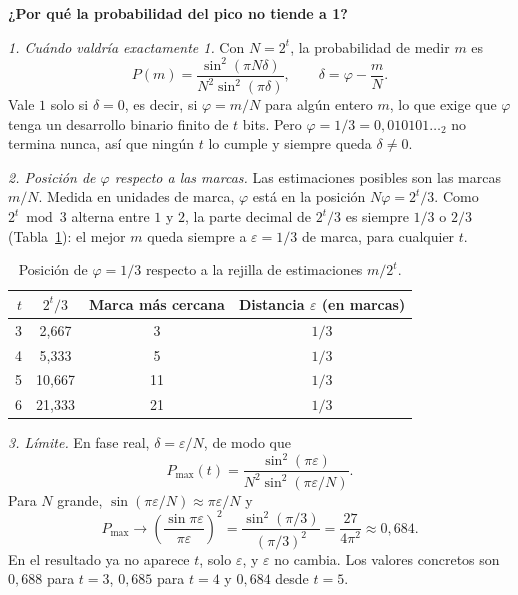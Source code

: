 \noindent\textbf{¿Por qué la probabilidad del pico no tiende a 1?}

\medskip
\noindent\textit{1. Cuándo valdría exactamente 1.} Con $N = 2^t$, la probabilidad de medir $m$ es
\begin{equation*}
  P(m) = \frac{\sin^2(\pi N\delta)}{N^2\sin^2(\pi\delta)},
  \qquad \delta = \varphi - \frac{m}{N}.
\end{equation*}
Vale $1$ solo si $\delta = 0$, es decir, si $\varphi = m/N$ para algún entero $m$, lo que exige
que $\varphi$ tenga un desarrollo binario finito de $t$ bits. Pero
$\varphi = 1/3 = 0{,}010101\ldots_2$ no termina nunca, así que ningún $t$ lo cumple y siempre
queda $\delta \neq 0$.

\medskip
\noindent\textit{2. Posición de $\varphi$ respecto a las marcas.} Las estimaciones posibles son
las marcas $m/N$. Medida en unidades de marca, $\varphi$ está en la posición $N\varphi = 2^t/3$.
Como $2^t \bmod 3$ alterna entre $1$ y $2$, la parte decimal de $2^t/3$ es siempre $1/3$ o
$2/3$ (Tabla~\ref{tab:marcas}): el mejor $m$ queda siempre a $\varepsilon = 1/3$ de marca,
para cualquier $t$.

\begin{table}[h]
  \centering
  \begin{tabular}{@{}rccc@{}}
    \toprule
    $t$ & $2^t/3$ & Marca más cercana & Distancia $\varepsilon$ (en marcas) \\
    \midrule
    3 & 2,667  & 3  & $1/3$ \\
    4 & 5,333  & 5  & $1/3$ \\
    5 & 10,667 & 11 & $1/3$ \\
    6 & 21,333 & 21 & $1/3$ \\
    \bottomrule
  \end{tabular}
  \caption{Posición de $\varphi = 1/3$ respecto a la rejilla de estimaciones $m/2^t$.}
  \label{tab:marcas}
\end{table}

\noindent\textit{3. Límite.} En fase real, $\delta = \varepsilon/N$, de modo que
\begin{equation*}
  P_{\max}(t) = \frac{\sin^2(\pi\varepsilon)}{N^2\sin^2(\pi\varepsilon/N)}.
\end{equation*}
Para $N$ grande, $\sin(\pi\varepsilon/N) \approx \pi\varepsilon/N$ y
\begin{equation*}
  P_{\max} \longrightarrow \left(\frac{\sin \pi\varepsilon}{\pi\varepsilon}\right)^{2}
  = \frac{\sin^2(\pi/3)}{(\pi/3)^2} = \frac{27}{4\pi^2} \approx 0{,}684 .
\end{equation*}
En el resultado ya no aparece $t$, solo $\varepsilon$, y $\varepsilon$ no cambia. Los valores
concretos son $0{,}688$ para $t=3$, $0{,}685$ para $t=4$ y $0{,}684$ desde $t=5$.

